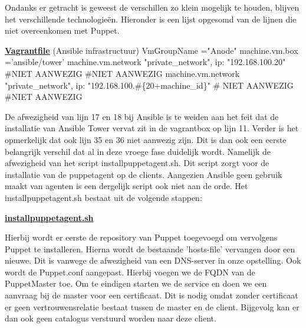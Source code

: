 Ondanks er getracht is geweest de verschillen zo klein mogelijk te houden, blijven het verschillende technologie\"en. Hieronder is een lijst opgesomd van de lijnen die niet overeenkomen met Puppet.

\underline{\textbf{Vagrantfile}} (Ansible infrastructuur) VmGroupName ="Anode"  machine.vm.box ='ansible/tower'   machine.vm.network "private\_network", ip: "192.168.100.20"   \#NIET AANWEZIG  \#NIET AANWEZIG  machine.vm.network "private\_network", ip: "192.168.100.\#\{20+machine\_id\}"    \# NIET AANWEZIG \#NIET AANWEZIG\newline

De afwezigheid van lijn 17 en 18 bij Ansible is te weiden aan het feit dat de installatie van Ansible Tower vervat zit in de vagrantbox op lijn 11. Verder is het opmerkelijk dat ook lijn 35 en 36 niet aanwezig zijn. Dit is dan ook een eerste belangrijk verschil dat al in deze vroege fase duidelijk wordt. Namelijk de afwezigheid van het script installpuppetagent.sh. Dit script zorgt voor de installatie van de puppetagent op de clients. Aangezien Ansible geen gebruik maakt van agenten is een dergelijk script ook niet aan de orde.
Het installpuppetagent.sh bestaat uit de volgende stappen:

\underline{\textbf{installpuppetagent.sh}} 


Hierbij wordt er eerste de repository van Puppet toegevoegd om vervolgens Puppet te installeren. Hierna wordt de bestaande 'hosts-file' vervangen  door een nieuwe. Dit is vanwege de afwezigheid van een DNS-server in onze opstelling. Ook wordt de Puppet.conf aangepast. Hierbij voegen we de FQDN van de PuppetMaster toe. Om te eindigen starten we de service en doen we een aanvraag bij de master voor een certificaat. Dit is nodig omdat zonder certificaat er geen vertrouwensrelatie bestaat tussen de master en de client. Bijgevolg kan er dan ook geen catalogus verstuurd worden naar deze client.






















